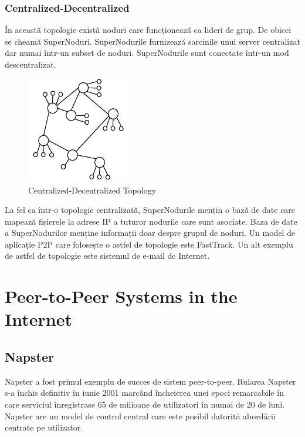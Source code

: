 \subsubsection{Centralized-Decentralized}

În această topologie există noduri care funcționează ca lideri de grup. De
obicei se cheamă SuperNoduri. SuperNodurile furnizează sarcinile unui server
centralizat dar numai într-un subset de noduri. SuperNodurile sunt conectate
într-un mod descentralizat.

\begin{figure}
  \centering
  \includegraphics[width=0.4\textwidth]{src/img/p2p-systems/centralized-decentralized}
  \caption{Centralized-Decentralized Topology}
  \label{fig:p2p-systems:centralized-decentralized}
\end{figure}

La fel ca într-o topologie centralizată, SuperNodurile mențin o bază de date
care mapează fișierele la adrese IP a tuturor nodurile care sunt asociate.
Baza de date a SuperNodurilor menține informații doar despre grupul de noduri.
Un model de aplicație P2P care folosește o astfel de topologie este FastTrack.
Un alt exemplu de astfel de topologie este sistemul de e-mail de Internet.

\section{Peer-to-Peer Systems in the Internet}
\label{sec:p2p-systems:p2p-internet}

\subsection{Napster}

Napster a fost primul exemplu de succes de sistem peer-to-peer. Rularea
Napster s-a închis definitiv în iunie 2001 marcând încheierea unei epoci
remarcabile în care serviciul înregistrase 65 de milioane de utilizatori în
numai de 20 de luni. Napster are un model de control central care este posibil
datorită abordării centrate pe utilizator.

